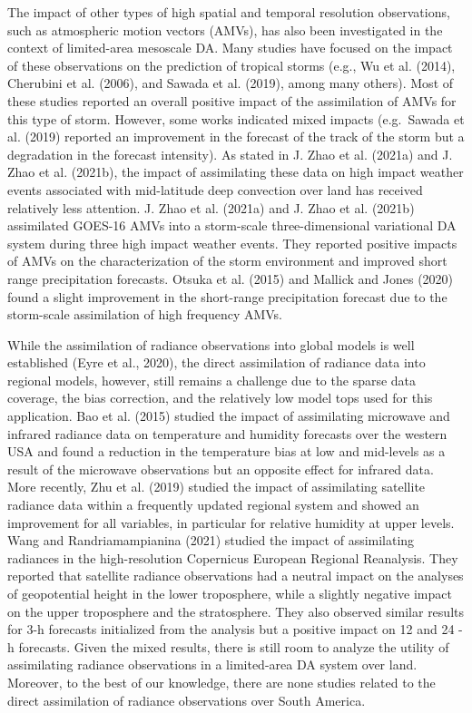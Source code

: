 \documentclass[authoryear,preprint,review,12pt]{elsarticle} %
\begin{document}
The impact of other types of high spatial and temporal resolution observations, such as atmospheric motion vectors (AMVs), has also been investigated in the context of limited-area mesoscale DA. Many studies have focused on the impact of these observations on the prediction of tropical storms (e.g., Wu et al. (2014), Cherubini et al. (2006), and Sawada et al. (2019), among many others). Most of these studies reported an overall positive impact of the assimilation of AMVs for this type of storm. However, some works indicated mixed impacts (e.g.~Sawada et al. (2019) reported an improvement in the forecast of the track of the storm but a degradation in the forecast intensity). As stated in J. Zhao et al. (2021a) and J. Zhao et al. (2021b), the impact of assimilating these data on high impact weather events associated with mid-latitude deep convection over land has received relatively less attention. J. Zhao et al. (2021a) and J. Zhao et al. (2021b) assimilated GOES-16 AMVs into a storm-scale three-dimensional variational DA system during three high impact weather events. They reported positive impacts of AMVs on the characterization of the storm environment and improved short range precipitation forecasts. Otsuka et al. (2015) and Mallick and Jones (2020) found a slight improvement in the short-range precipitation forecast due to the storm-scale assimilation of high frequency AMVs.

While the assimilation of radiance observations into global models is well established (Eyre et al., 2020), the direct assimilation of radiance data into regional models, however, still remains a challenge due to the sparse data coverage, the bias correction, and the relatively low model tops used for this application. Bao et al. (2015) studied the impact of assimilating microwave and infrared radiance data on temperature and humidity forecasts over the western USA and found a reduction in the temperature bias at low and mid-levels as a result of the microwave observations but an opposite effect for infrared data. More recently, Zhu et al. (2019) studied the impact of assimilating satellite radiance data within a frequently updated regional system and showed an improvement for all variables, in particular for relative humidity at upper levels. Wang and Randriamampianina (2021) studied the impact of assimilating radiances in the high-resolution Copernicus European Regional Reanalysis. They reported that satellite radiance observations had a neutral impact on the analyses of geopotential height in the lower troposphere, while a slightly negative impact on the upper troposphere and the stratosphere. They also observed similar results for 3-h forecasts initialized from the analysis but a positive impact on 12 and 24 -h forecasts. Given the mixed results, there is still room to analyze the utility of assimilating radiance observations in a limited-area DA system over land. Moreover, to the best of our knowledge, there are none studies related to the direct assimilation of radiance observations over South America.
\end{document}
